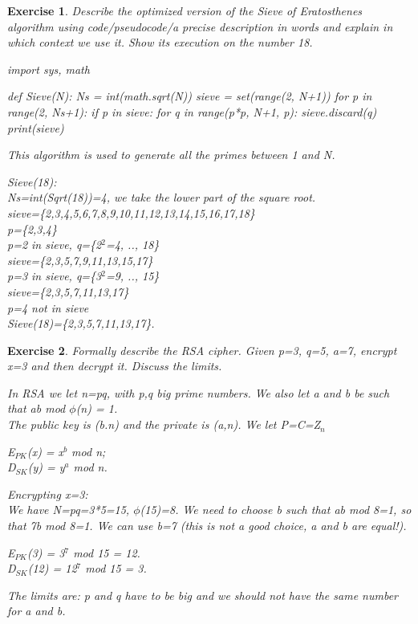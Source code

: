 \documentclass[a4paper, 12pt]{report}
\newtheorem{exercise}{\textbf{Exercise}}
\begin{document}
\begin{exercise}
	Describe the optimized version of the Sieve of Eratosthenes algorithm using code/pseudocode/a precise description in words and explain in which context we use it. Show its execution on the number 18.
	
\begin{python}
import sys, math

def Sieve(N):
	Ns = int(math.sqrt(N))
	sieve = set(range(2, N+1))
	for p in range(2, Ns+1):
		if p in sieve:
			for q in range(p*p, N+1, p):
				sieve.discard(q)
	print(sieve)
\end{python}
This algorithm is used to generate all the primes between 1 and N.

Sieve(18):\\
Ns=int(Sqrt(18))=4, we take the lower part of the square root.\\
sieve=\{2,3,4,5,6,7,8,9,10,11,12,13,14,15,16,17,18\}\\
p=\{2,3,4\}\\
p=2 in sieve, q=\{2$^2$=4, .., 18\}\\
sieve=\{2,3,5,7,9,11,13,15,17\}\\
p=3 in sieve, q=\{3$^2$=9, .., 15\}\\
sieve=\{2,3,5,7,11,13,17\}\\
p=4 not in sieve\\

Sieve(18)=\{2,3,5,7,11,13,17\}.
\end{exercise}

\begin{exercise}
	Formally describe the RSA cipher. Given p=3, q=5, a=7, encrypt x=3 and then decrypt it. Discuss the limits.
	
	In RSA we let n=pq, with p,q big prime numbers. We also let a and b be such that ab mod $\phi$(n) = 1.\\
	The public key is (b.n) and the private is (a,n). We let P=C=Z$_n$
	
	E$_{PK}$(x) = x$^b$ mod n;\\
	D$_{SK}$(y) = y$^a$ mod n.
	
	Encrypting x=3:\\
	We have N=pq=3*5=15, $\phi$(15)=8. We need to choose b such that ab mod 8=1, so that 7b mod 8=1. We can use b=7 (this is not a good choice, a and b are equal!).
	
	E$_{PK}$(3) = 3$^7$ mod 15 = 12.\\
	D$_{SK}$(12) = 12$^7$ mod 15 = 3.
	
	The limits are: p and q have to be big and we should not have the same number for a and b.
\end{exercise}
\end{document}
